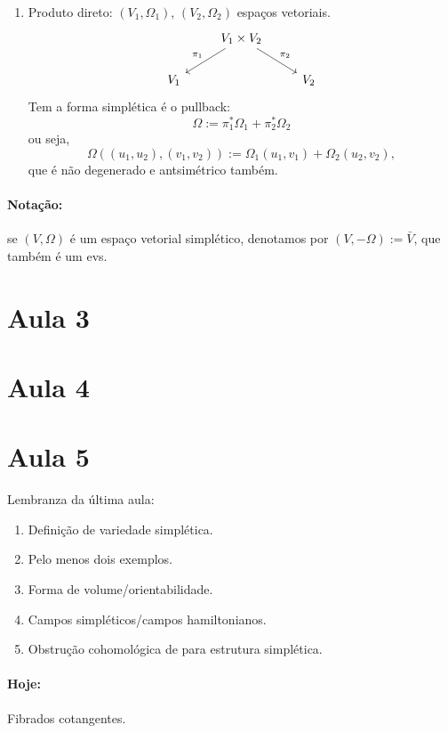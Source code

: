 \begin{example}
\begin{enumerate}
\item Produto direto: $(V_1,\Omega_1)$, $(V_2,\Omega_2)$ espa\c cos vetoriais.
	\[\begin{tikzcd}
		&V_1\times V_2\arrow[ld,"\pi_1",swap]\arrow[rd,"\pi_2"]\\
		V_1&&V_2
	\end{tikzcd}\]
Tem a forma simpl\'etica \'e o pullback:
	\[\Omega:=\pi_1^{*} \Omega_1+\pi_2^{*} \Omega_2\]
	ou seja,
	\[\Omega((u_1,u_2),(v_1,v_2)):=\Omega_1(u_1,v_1)+\Omega_2(u_2,v_2),\]
	que \'e n\~ao degenerado e antsim\'etrico tamb\'em.
\end{enumerate}
\end{example}

\paragraph{Nota\c c\~ao:} se $(V,\Omega)$ \'e um espa\c co vetorial simpl\'etico, denotamos por $(V,-\Omega):=\bar{V}$, que tamb\'em \'e um evs.

\section{Aula 3}

\section{Aula 4}

\section{Aula 5}

Lembranza da \'ultima aula:
\begin{enumerate}
	\item Defini\c c\~ao de variedade simpl\'etica.
	\item Pelo menos dois exemplos.
	
	\item Forma de volume/orientabilidade.
	
	\item Campos simpl\'eticos/campos hamiltonianos.

	\item Obstru\c c\~ao cohomol\'ogica de para estrutura simpl\'etica.
\end{enumerate}

\paragraph{Hoje:} Fibrados cotangentes.

